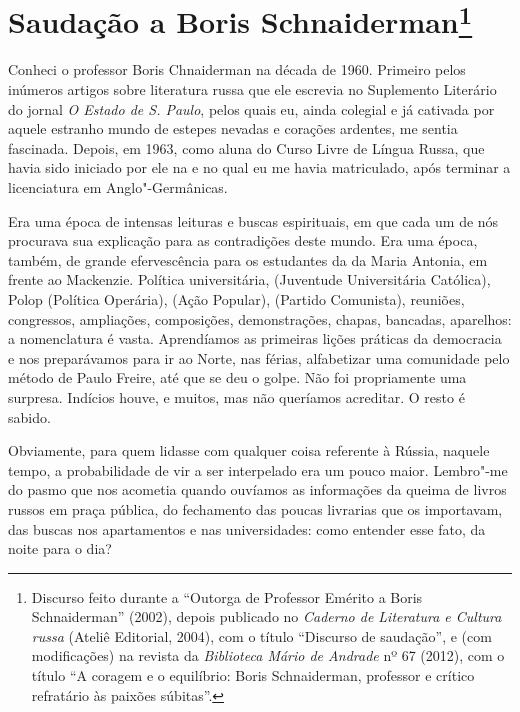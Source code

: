 \chapter{Saudação a Boris Schnaiderman\footnote{Discurso feito durante a
  ``Outorga de Professor Emérito a Boris Schnaiderman'' (2002), depois
  publicado no \emph{Caderno de Literatura e Cultura russa} (Ateliê
  Editorial, 2004), com o título ``Discurso de saudação'', e (com
 modificações) na revista da \emph{Biblioteca Mário de
  Andrade} nº 67 (2012), com o título ``A coragem e o equilíbrio: Boris
  Schnaiderman, professor e crítico refratário às paixões súbitas''.}}
\label{boris}

Conheci o professor Boris Chnaiderman na década de 1960. Primeiro pelos
inúmeros artigos sobre literatura russa que ele escrevia no Suplemento
Literário do jornal \emph{O Estado de S. Paulo}, pelos quais eu, ainda
colegial e já cativada por aquele estranho mundo de estepes nevadas e
corações ardentes, me sentia fascinada. Depois, em 1963, como aluna do
Curso Livre de Língua Russa, que havia sido iniciado por ele na  e no
qual eu me havia matriculado, após terminar a licenciatura em
Anglo"-Germânicas.

Era uma época de intensas leituras e buscas espirituais, em que cada um
de nós procurava sua explicação para as contradições deste mundo. Era
uma época, também, de grande efervescência para os estudantes da  da
Maria Antonia, em frente ao Mackenzie. Política universitária, 
(Juventude Universitária Católica), Polop (Política Operária),  (Ação
Popular),  (Partido Comunista), reuniões, congressos, ampliações,
composições, demonstrações, chapas, bancadas, aparelhos: a nomenclatura
é vasta. Aprendíamos as primeiras lições práticas da democracia e nos
preparávamos para ir ao Norte, nas férias, alfabetizar uma comunidade
pelo método de Paulo Freire, até que se deu o golpe. Não foi
propriamente uma surpresa. Indícios houve, e muitos, mas não queríamos
acreditar. O resto é sabido.

Obviamente, para quem lidasse com qualquer coisa referente à Rússia,
naquele tempo, a probabilidade de vir a ser interpelado era um pouco
maior. Lembro"-me do pasmo que nos acometia quando ouvíamos as
informações da queima de livros russos em praça pública, do fechamento
das poucas livrarias que os importavam, das buscas nos apartamentos e
nas universidades: como entender esse fato, da noite para o dia?

